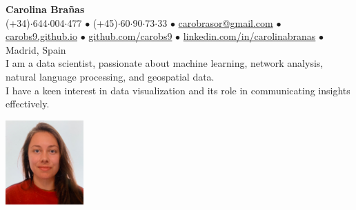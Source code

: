 \documentclass{resume}
\begin{document}
\vspace{-2em}
\begin{minipage}{0.75\textwidth}
    \raggedright
    {\Huge \textbf{Carolina Brañas}}\\[0.5em] 
    {\small
    (+34)$\cdot$644$\cdot$004$\cdot$477 $\bullet$ 
    (+45)$\cdot$60$\cdot$90$\cdot$73$\cdot$33 $\bullet$ 
    \href{mailto://carobrasor@gmail.com}{carobrasor@gmail.com} $\bullet$ 
    \href{https://carobs9.github.io/}{carobs9.github.io} $\bullet$ 
    \href{https://github.com/carobs9}{github.com/carobs9} $\bullet$ 
    \href{https://www.linkedin.com/in/carolinabranas/}{linkedin.com/in/carolinabranas} $\bullet$ 
    Madrid, Spain
    }\\[1em]
    I am a data scientist, passionate about machine learning, network analysis, natural language processing, and geospatial data. \\
    I have a keen interest in data visualization and its role in communicating insights effectively.
\end{minipage}%
\hfill
\begin{minipage}{0.23\textwidth}
    \begin{flushright}
        \includegraphics[width=3cm]{profile.jpg}
    \end{flushright}
\end{minipage}
\vspace{1em}

\end{document}
